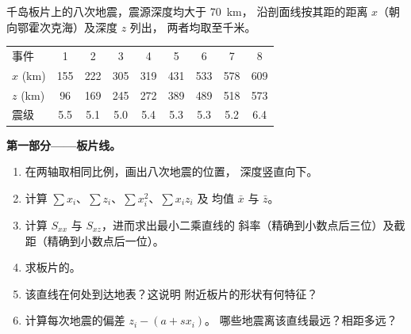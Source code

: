 \begin{problem}
\label{pb:b1:active-margins:1}
千岛板片上的八次地震，震源深度均大于 \qty{70}{km}，
沿剖面线按其距的距离 $x$（朝向鄂霍次克海）及深度 $z$ 列出，
两者均取至千米。

\begin{center}
\small
\begin{tabular}{lcccccccc}
\hline
事件 & 1 & 2 & 3 & 4 & 5 & 6 & 7 & 8\\
$x$ (\unit{km}) & 155 & 222 & 305 & 319 & 431 & 533 & 578 & 609\\
$z$ (\unit{km}) & 96 & 169 & 245 & 272 & 389 & 489 & 518 & 573\\
震级 & 5.5 & 5.1 & 5.0 & 5.4 & 5.3 & 5.3 & 5.2 & 6.4\\
\hline
\end{tabular}
\end{center}

\medskip
\noindent\textbf{第一部分——板片线。}
\begin{enumerate}
  \item 在两轴取相同比例，画出八次地震的位置，
        深度竖直向下。
  \item 计算 $\sum x_i$、$\sum z_i$、$\sum x_i^2$、$\sum x_i z_i$ 及
        均值 $\bar x$ 与 $\bar z$。
  \item 计算 $S_{xx}$ 与 $S_{xz}$，进而求出最小二乘直线的
        斜率（精确到小数点后三位）及截距（精确到小数点后一位）。
  \item 求板片的。
  \item 该直线在何处到达地表？这说明
        附近板片的形状有何特征？
  \item 计算每次地震的偏差 $z_i - (a + s x_i)$。
        哪些地震离该直线最远？相距多远？
\end{enumerate}


\end{problem}
